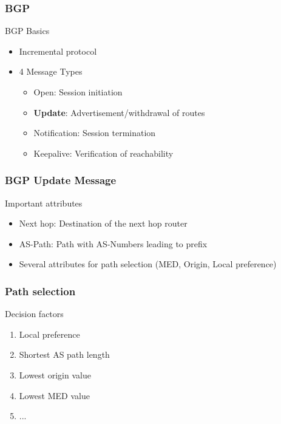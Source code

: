 \documentclass[notes=hide,yellow]{beamer}
\begin{document}
\begin{frame}
	\frametitle{BGP}
	\begin{block}{BGP Basics}
		\begin{itemize}

			\item Incremental protocol
			\item 4 Message Types
				\begin{itemize}
					\item Open: Session initiation
					\item \textbf{Update}: Advertisement/withdrawal of routes
					\item Notification: Session termination
					\item Keepalive: Verification of reachability
				\end{itemize} 
		\end{itemize}
	\end{block}
\end{frame}


\begin{frame}
	\frametitle{BGP Update Message}
	\begin{block}{Important attributes}
	\begin{itemize}
		\item Next hop: Destination of the next hop router   
		\item AS-Path: Path with AS-Numbers leading to prefix 
		\item Several attributes for path selection (MED, Origin, Local preference)
	\end{itemize}
	\end{block}
\end{frame}

\begin{frame}
	\frametitle{Path selection}
	
	\begin{block}{Decision factors}
	\begin{enumerate}
		\item Local preference 
		\item Shortest AS path length
		\item Lowest origin value
		\item Lowest MED value
		\item ...
	\end{enumerate}
	\end{block}
\end{frame}
\end{document}
